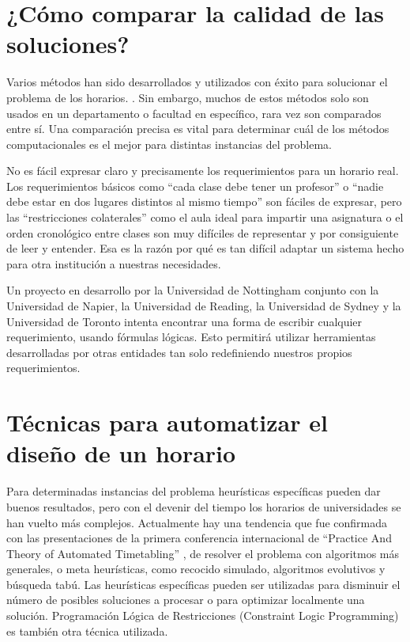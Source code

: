 \section{¿Cómo comparar la calidad de las soluciones?}

Varios métodos han sido desarrollados y utilizados con éxito para solucionar el problema de los horarios.
\cite{VA Bardadym, MW Carter, MW Carter and G Laporte, JH Kingston}. Sin embargo, muchos de estos métodos 
solo son usados en un departamento o facultad en específico, rara vez son comparados entre sí. Una 
comparación precisa es vital para determinar cuál de los métodos computacionales es el mejor para
distintas instancias del problema.

No es fácil expresar claro y precisamente los requerimientos para un horario real. Los requerimientos básicos
como ``cada clase debe tener un profesor'' o ``nadie debe estar en dos lugares distintos al mismo tiempo'' son
fáciles de expresar, pero las ``restricciones colaterales'' como el aula ideal para impartir una asignatura o
el orden cronológico entre clases son muy difíciles de representar y por consiguiente de leer y entender. Esa
es la razón por qué es tan difícil adaptar un sistema hecho para otra institución a nuestras necesidades.

Un proyecto en desarrollo por la Universidad de Nottingham conjunto con la Universidad de Napier, la Universidad
de Reading, la Universidad de Sydney y la Universidad de Toronto intenta encontrar una forma de escribir cualquier
requerimiento, usando fórmulas lógicas. Esto permitirá utilizar herramientas desarrolladas por otras entidades tan
solo redefiniendo nuestros propios requerimientos.

\section{Técnicas para automatizar el diseño de un horario}

Para determinadas instancias del problema heurísticas específicas pueden dar buenos resultados, pero con el devenir del tiempo los horarios de universidades se han vuelto más complejos. Actualmente hay una tendencia que fue confirmada
con las presentaciones de la primera conferencia internacional de ``Practice And Theory of Automated Timetabling''
\cite{D Abramson and J Abela}, de resolver el problema con algoritmos más generales, o meta heurísticas, como
recocido simulado, algoritmos evolutivos y búsqueda tabú. Las heurísticas específicas pueden ser utilizadas
para disminuir el número de posibles soluciones a procesar o para optimizar localmente una solución. Programación
Lógica de Restricciones (Constraint Logic Programming) es también otra técnica utilizada.

